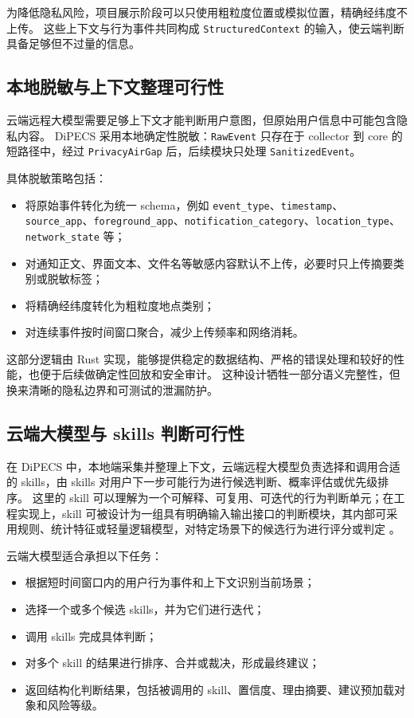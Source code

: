\documentclass[12pt,a4paper]{article}
\begin{document}
为降低隐私风险，项目展示阶段可以只使用粗粒度位置或模拟位置，精确经纬度不上传。
这些上下文与行为事件共同构成 \texttt{StructuredContext} 的输入，使云端判断具备足够但不过量的信息。

\subsection{本地脱敏与上下文整理可行性}\label{subsec:privacy}

云端远程大模型需要足够上下文才能判断用户意图，但原始用户信息中可能包含隐私内容。
DiPECS 采用本地确定性脱敏：\texttt{RawEvent} 只存在于 collector 到 core 的短路径中，经过 \texttt{PrivacyAirGap} 后，后续模块只处理 \texttt{SanitizedEvent}。

具体脱敏策略包括：

\begin{itemize}
  \item 将原始事件转化为统一 schema，例如 \texttt{event\_type}、\texttt{timestamp}、\texttt{source\_app}、\texttt{foreground\_app}、\texttt{notification\_category}、\texttt{location\_type}、\texttt{network\_state} 等；
  \item 对通知正文、界面文本、文件名等敏感内容默认不上传，必要时只上传摘要类别或脱敏标签；
  \item 将精确经纬度转化为粗粒度地点类别；
  \item 对连续事件按时间窗口聚合，减少上传频率和网络消耗。
\end{itemize}

这部分逻辑由 Rust 实现，能够提供稳定的数据结构、严格的错误处理和较好的性能，也便于后续做确定性回放和安全审计。
这种设计牺牲一部分语义完整性，但换来清晰的隐私边界和可测试的泄漏防护。

\subsection{云端大模型与 skills 判断可行性}\label{subsec:cloud-skills}

在 DiPECS 中，本地端采集并整理上下文，云端远程大模型负责选择和调用合适的 skills，由 skills 对用户下一步可能行为进行候选判断、概率评估或优先级排序。
这里的 skill 可以理解为一个可解释、可复用、可迭代的行为判断单元；在工程实现上，skill 可被设计为一组具有明确输入输出接口的判断模块，其内部可采用规则、统计特征或轻量逻辑模型，对特定场景下的候选行为进行评分或判定 \cite{xi2023rise}。

云端大模型适合承担以下任务：

\begin{itemize}
  \item 根据短时间窗口内的用户行为事件和上下文识别当前场景；
  \item 选择一个或多个候选 skills，并为它们进行迭代；
  \item 调用 skills 完成具体判断；
  \item 对多个 skill 的结果进行排序、合并或裁决，形成最终建议；
  \item 返回结构化判断结果，包括被调用的 skill、置信度、理由摘要、建议预加载对象和风险等级。
\end{itemize}
\end{document}
